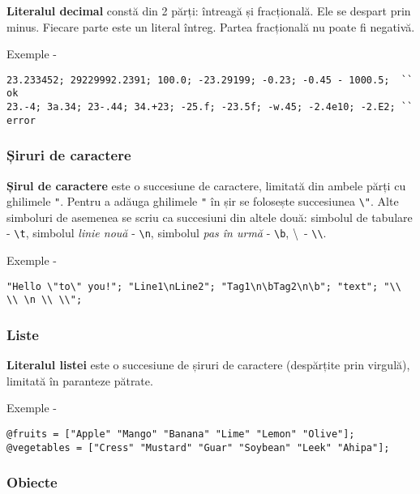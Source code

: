 {\bf Literalul decimal} constă din 2 părți: întreagă și fracțională. Ele se despart prin minus. Fiecare parte este un literal întreg. Partea fracțională nu poate fi negativă.

\noindent Exemple -
\begin{lstlisting}[numbers=none]
23.233452; 29229992.2391; 100.0; -23.29199; -0.23; -0.45 - 1000.5;  `` ok
23.-4; 3а.34; 23-.44; 34.+23; -25.f; -23.5f; -w.45; -2.4e10; -2.E2; `` error
\end{lstlisting}

\subsubsection{Șiruri de caractere}

{\bf Șirul de caractere} este o succesiune de caractere, limitată din ambele părți cu ghilimele \lstinline|"|. Pentru a adăuga ghilimele \lstinline|"| în șir se folosește succesiunea \lstinline|\"|. Alte simboluri de asemenea se scriu ca succesiuni din altele două: simbolul de tabulare - \lstinline|\t|, simbolul {\it linie nouă} - \lstinline|\n|, simbolul {\it pas în urmă} - \lstinline|\b|, \textbackslash \ - \lstinline|\\|.

\noindent Exemple -
\begin{lstlisting}[numbers=none]
"Hello \"to\" you!"; "Line1\nLine2"; "Tag1\n\bTag2\n\b"; "text"; "\\ \\ \n \\ \\";
\end{lstlisting}

\subsubsection{Liste}

{\bf Literalul listei} este o succesiune de șiruri de caractere (despărțite prin virgulă), limitată în paranteze pătrate.

\noindent Exemple -
\begin{lstlisting}[numbers=none]
@fruits = ["Apple" "Mango" "Banana" "Lime" "Lemon" "Olive"];
@vegetables = ["Cress" "Mustard" "Guar" "Soybean" "Leek" "Ahipa"];
\end{lstlisting}

\subsubsection{Obiecte}

